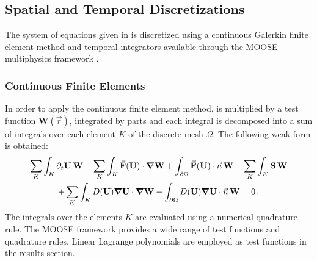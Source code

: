 \documentclass{mc2015}
\begin{document}
\subsection{Spatial and Temporal Discretizations} \label{sec:spatial-disc}
%
The system of equations given in  is discretized using a continuous Galerkin finite element 
method and temporal integrators available through the MOOSE multiphysics framework \cite{MOOSE}.
%
\subsubsection{Continuous Finite Elements} 
%
In order to apply the continuous finite element method,  is multiplied by a test function 
$\mathbf W(\vec{r})$, integrated by parts and each integral is decomposed into a sum of integrals over 
each element $K$ of the discrete mesh $\Omega$. The following weak form is obtained:
\begin{multline}\label{eq:cfem}
\sum_K \int_{K} \partial_t \mathbf U \, \mathbf W - \sum_K \int_{K} \vec{\mathbf F}(\mathbf U) \cdot \boldsymbol\nabla \mathbf W + \int_{\partial \Omega} \vec{\mathbf F}(\mathbf U) \cdot \vec{n} \, \mathbf W - \sum_K \int_{K} \mathbf S \, \mathbf W  \\
+ \sum_K \int_{K} D(\mathbf U) \boldsymbol\nabla \mathbf U \cdot \boldsymbol\nabla \mathbf W 
- \int_{\partial \Omega} D(\mathbf U) \boldsymbol\nabla \mathbf U \cdot \vec{n} \, \mathbf W = 0 \,.
\end{multline}
The integrals over the elements $K$ are evaluated using a numerical quadrature rule. The MOOSE framework 
provides a wide range of test functions and quadrature rules. Linear Lagrange polynomials are employed 
as test functions in the results section.
%
\end{document}
